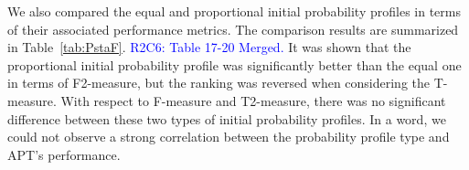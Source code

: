 \documentclass[10pt,journal,compsoc]{IEEEtran}
\begin{document}
We also compared the equal and proportional initial probability profiles in terms of their associated performance metrics. The comparison results are summarized in Table~\ref{tab:PstaF}.
\textcolor{blue}{R2C6: Table 17-20 Merged.}%
It was shown that the proportional initial probability profile was significantly better than the equal one in terms of F2-measure, but the ranking was reversed when considering the T-measure. With respect to F-measure and T2-measure, there was no significant difference between these two types of initial probability profiles. In a word, we could not observe a strong correlation between the probability profile type and APT's performance.

\end{document}
